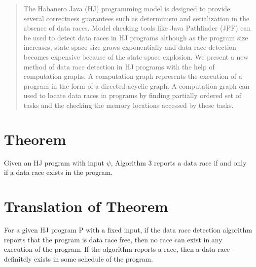 \documentclass[10pt]{article}
\begin{document}
\maketitle

\begin{abstract}
The Habanero Java (HJ) programming model is designed to provide several correctness guarantees such as determinism and serialization in the absence of data races. Model checking tools like Java Pathfinder (JPF) can be used to detect data races in HJ programs although as the program size increases, state space size grows exponentially and data race detection becomes expensive because of the state space explosion. We present a new method of data race detection in HJ programs with the help of computation graphs. A computation graph represents the execution of a program in the form of a directed acyclic graph. A computation graph can used to locate data races in programs by finding partially ordered set of tasks and the checking the memory locations accessed by these tasks.
\end{abstract}

\section{Theorem}
Given an HJ program with input $\psi$, Algorithm 3 reports a data race if and only if a data race exists in the program.

\section{Translation of Theorem}
For a given HJ program P with a fixed input, if the data race detection algorithm reports that the program is data race free, then no race can exist in any execution of the program. If the algorithm reports a race, then a data race definitely exists in some schedule of the program.
\end{document}
